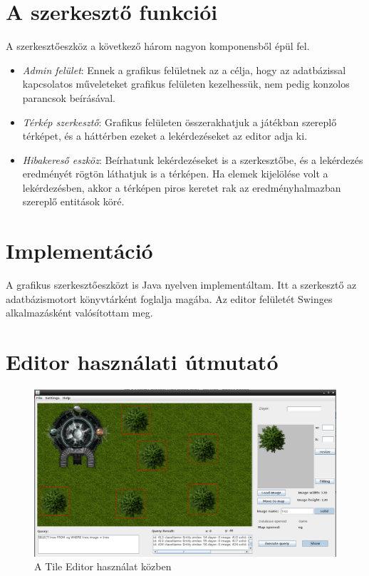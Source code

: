 
\section{A szerkesztő funkciói}

A szerkesztőeszköz a következő három nagyon komponensből épül fel.
\begin{itemize}
\item \textit{Admin felület}: Ennek a grafikus felületnek az a célja, hogy az
adatbázissal kapcsolatos műveleteket grafikus felületen kezelhessük, nem pedig konzolos parancsok beírásával.
\item \textit{Térkép szerkesztő}: Grafikus felületen összerakhatjuk a játékban szereplő térképet, és a háttérben ezeket a lekérdezéseket az editor adja ki.
\item \textit{Hibakereső eszköz}: Beírhatunk lekérdezéseket is a szerkesztőbe, és a lekérdezés eredményét rögtön láthatjuk is a térképen. Ha elemek kijelölése volt a lekérdezésben, akkor a térképen piros keretet rak az eredményhalmazban szereplő entitások köré.
	
\end{itemize}

\section{Implementáció}

A grafikus szerkesztőeszközt is Java nyelven implementáltam. Itt a szerkesztő az adatbázismotort könyvtárként foglalja magába. Az editor felületét Swinges alkalmazásként valósítottam meg.

\section{Editor használati útmutató}

\begin{figure}[htb]
	\begin{center}
		\includegraphics[scale=0.34]{images/editor}
		\caption{A Tile Editor használat közben}
		\label{fig:editor}
	\end{center}
\end{figure}

